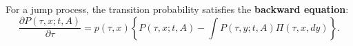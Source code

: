 For a jump process, the transition probability satisfies the \textbf{backward equation}:
$$\frac{\partial P(\tau, x; t, A)}{\partial \tau} = p(\tau, x) \left\{ P(\tau, x; t, A) - \int P(\tau, y; t, A) \Pi(\tau, x, dy) \right\}.$$
